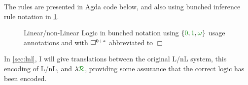 The rules are presented in Agda code below, and also using bunched inference
rule notation in \cref{fig:LnL-bunched}.

\begin{figure}
  \caption{Linear/non-Linear Logic in bunched notation using
    $\{\gr0, \gr1, \gr\omega\}$ usage annotations and with $\Box^{0{+}{*}}$ abbreviated
    to $\Box$}
  \label{fig:LnL-bunched}
\end{figure}


In \cref{sec:lnl}, I will give translations between the original L/nL system,
this encoding of L/nL, and $\name$, providing some assurance that the correct
logic has been encoded.

